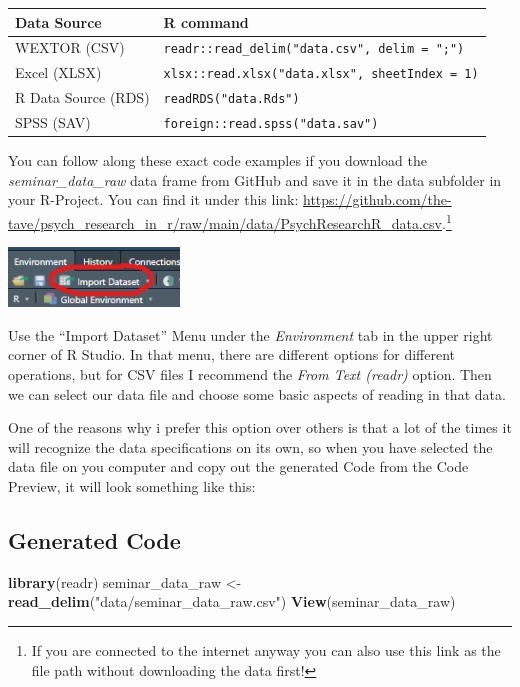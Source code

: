 \documentclass[
]{book}
\newenvironment{Shaded}{\begin{snugshade}}{\end{snugshade}}
\newcommand{\FunctionTok}[1]{\textcolor[rgb]{0.13,0.29,0.53}{\textbf{#1}}}
\newcommand{\NormalTok}[1]{#1}
\newcommand{\OtherTok}[1]{\textcolor[rgb]{0.56,0.35,0.01}{#1}}
\newcommand{\StringTok}[1]{\textcolor[rgb]{0.31,0.60,0.02}{#1}}
\begin{document}
\begin{longtable}[]{@{}ll@{}}
\toprule\noalign{}
Data Source & R command \\
\midrule\noalign{}
\endhead
\bottomrule\noalign{}
\endlastfoot
WEXTOR (CSV) & \texttt{readr::read\_delim("data.csv",\ delim\ =\ ";")} \\
Excel (XLSX) & \texttt{xlsx::read.xlsx("data.xlsx",\ sheetIndex\ =\ 1)} \\
R Data Source (RDS) & \texttt{readRDS("data.Rds")} \\
SPSS (SAV) & \texttt{foreign::read.spss("data.sav")} \\
\end{longtable}

You can follow along these exact code examples if you download the \emph{seminar\_data\_raw} data frame from GitHub and save it in the data subfolder in your R-Project.
You can find it under this link: \url{https://github.com/the-tave/psych_research_in_r/raw/main/data/PsychResearchR_data.csv}.\footnote{If you are connected to the internet anyway you can also use this link as the file path without downloading the data first!}

\includegraphics[width=\textwidth,height=0.625in]{./img/import_dataset.png}

Use the ``Import Dataset'' Menu under the \emph{Environment} tab in the upper right corner of R Studio.
In that menu, there are different options for different operations, but for CSV files I recommend the \emph{From Text (readr)} option.
Then we can select our data file and choose some basic aspects of reading in that data.

One of the reasons why i prefer this option over others is that a lot of the times it will recognize the data specifications on its own, so when you have selected the data file on you computer and copy out the generated Code from the Code Preview, it will look something like this:

\subsection*{Generated Code}\label{generated-code}

\begin{Shaded}
\begin{Highlighting}[]
\FunctionTok{library}\NormalTok{(readr)}
\NormalTok{seminar\_data\_raw }\OtherTok{\textless{}{-}} \FunctionTok{read\_delim}\NormalTok{(}\StringTok{"data/seminar\_data\_raw.csv"}\NormalTok{)}
\FunctionTok{View}\NormalTok{(seminar\_data\_raw)}
\end{Highlighting}
\end{Shaded}
\end{document}
